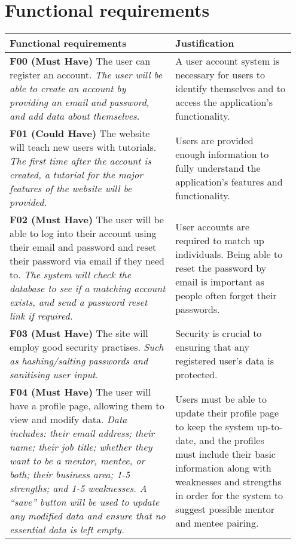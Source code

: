 \documentclass[10pt]{article}
\begin{document}
\vspace{-4mm}\section{Functional requirements}\vspace{-2mm}
\begin{longtable}{|p{0.55\linewidth}|p{0.4\linewidth}|}
\hline \textbf{Functional requirements} & \textbf{Justification} \\ \hline

    \textbf{F00 (Must Have) }
    The user can register an account.
    \textit{The user will be able to create an account by providing an email and
    password, and add data about themselves.}
        &
    A user account system is necessary for users to identify themselves and to
    access the application's functionality.
    \\ \hline

    \textbf{F01 (Could Have) }
    The website will teach new users with tutorials.
    \textit{The first time after the account is created, a tutorial for the
    major features of the website will be provided.}
        &
    Users are provided enough information to fully understand the application's
    features and functionality.
    \\ \hline

    \textbf{F02 (Must Have) }
    The user will be able to log into their account using their email and
    password and reset their password via email if they need to.
    \textit{The system will check the database to see if a matching account
    exists, and send a password reset link if required.}
        &
    User accounts are required to match up individuals. Being able to reset the
    password by email is important as people often forget their passwords.
    \\ \hline

    \textbf{F03 (Must Have) }
    The site will employ good security practises.
    \textit{Such as hashing/salting passwords and sanitising user input.}
        &
    Security is crucial to ensuring that any registered user’s data is protected.
    \\ \hline

    \textbf{F04 (Must Have) }
    The user will have a profile page, allowing them to view and modify data.
    \textit{Data includes: their email address; their name; their job title;
    whether they want to be a mentor, mentee, or both; their business area; 1-5
    strengths; and 1-5 weaknesses. A “save” button will be used to update any
    modified data and ensure that no essential data is left empty.}
        &
    Users must be able to update their profile page to keep the system
    up-to-date, and the profiles must include their basic information along with
    weaknesses and strengths in order for the system to suggest possible mentor
    and mentee pairing.
    \\ \hline


\end{longtable}
\end{document}
